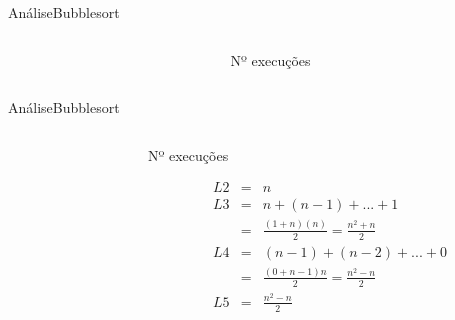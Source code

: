 \documentclass[aspectratio=169]{beamer}
\begin{document}

\begin{frame}[fragile]{Análise}{Bubblesort}
\begin{columns}[T] %
\begin{column}{.55\textwidth}

\end{column}%
\hfill%
\begin{column}{.45\textwidth}
Nº execuções

\end{column}%
\end{columns}
\end{frame}


\begin{frame}[fragile]{Análise}{Bubblesort}
\begin{columns}[T] %
\begin{column}{.55\textwidth}

\end{column}%
\hfill%
\begin{column}{.45\textwidth}
Nº execuções
\begin{small}
\begin{eqnarray}
L2 &=& n \nonumber \\
L3 &=& n + (n-1) + ... + 1 \nonumber \\
   &=& \frac{(1+n)(n)}{2} = \frac{n^2+n}{2} \nonumber \\
L4 &=& (n-1)+ (n-2) + ... + 0 \nonumber \\   
   &=& \frac{(0+n-1)n}{2} = \frac{n^2-n}{2} \nonumber \\
L5 &=& \frac{n^2-n}{2}  \nonumber
\end{eqnarray}
\end{small}
\end{column}%
\end{columns}
\end{frame}
\end{document}
